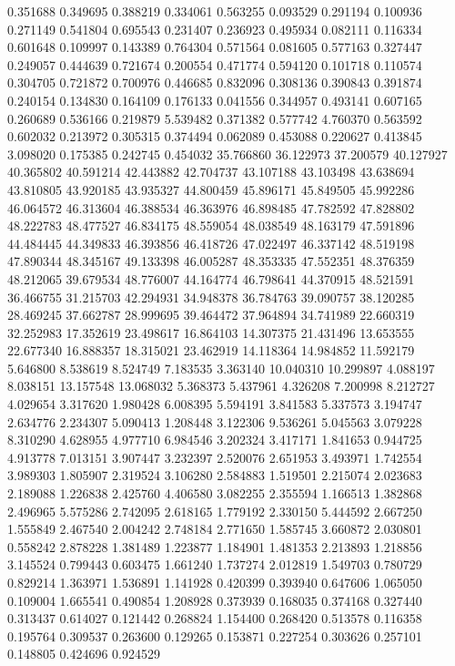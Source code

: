 0.351688
0.349695
0.388219
0.334061
0.563255
0.093529
0.291194
0.100936
0.271149
0.541804
0.695543
0.231407
0.236923
0.495934
0.082111
0.116334
0.601648
0.109997
0.143389
0.764304
0.571564
0.081605
0.577163
0.327447
0.249057
0.444639
0.721674
0.200554
0.471774
0.594120
0.101718
0.110574
0.304705
0.721872
0.700976
0.446685
0.832096
0.308136
0.390843
0.391874
0.240154
0.134830
0.164109
0.176133
0.041556
0.344957
0.493141
0.607165
0.260689
0.536166
0.219879
5.539482
0.371382
0.577742
4.760370
0.563592
0.602032
0.213972
0.305315
0.374494
0.062089
0.453088
0.220627
0.413845
3.098020
0.175385
0.242745
0.454032
35.766860
36.122973
37.200579
40.127927
40.365802
40.591214
42.443882
42.704737
43.107188
43.103498
43.638694
43.810805
43.920185
43.935327
44.800459
45.896171
45.849505
45.992286
46.064572
46.313604
46.388534
46.363976
46.898485
47.782592
47.828802
48.222783
48.477527
46.834175
48.559054
48.038549
48.163179
47.591896
44.484445
44.349833
46.393856
46.418726
47.022497
46.337142
48.519198
47.890344
48.345167
49.133398
46.005287
48.353335
47.552351
48.376359
48.212065
39.679534
48.776007
44.164774
46.798641
44.370915
48.521591
36.466755
31.215703
42.294931
34.948378
36.784763
39.090757
38.120285
28.469245
37.662787
28.999695
39.464472
37.964894
34.741989
22.660319
32.252983
17.352619
23.498617
16.864103
14.307375
21.431496
13.653555
22.677340
16.888357
18.315021
23.462919
14.118364
14.984852
11.592179
5.646800
8.538619
8.524749
7.183535
3.363140
10.040310
10.299897
4.088197
8.038151
13.157548
13.068032
5.368373
5.437961
4.326208
7.200998
8.212727
4.029654
3.317620
1.980428
6.008395
5.594191
3.841583
5.337573
3.194747
2.634776
2.234307
5.090413
1.208448
3.122306
9.536261
5.045563
3.079228
8.310290
4.628955
4.977710
6.984546
3.202324
3.417171
1.841653
0.944725
4.913778
7.013151
3.907447
3.232397
2.520076
2.651953
3.493971
1.742554
3.989303
1.805907
2.319524
3.106280
2.584883
1.519501
2.215074
2.023683
2.189088
1.226838
2.425760
4.406580
3.082255
2.355594
1.166513
1.382868
2.496965
5.575286
2.742095
2.618165
1.779192
2.330150
5.444592
2.667250
1.555849
2.467540
2.004242
2.748184
2.771650
1.585745
3.660872
2.030801
0.558242
2.878228
1.381489
1.223877
1.184901
1.481353
2.213893
1.218856
3.145524
0.799443
0.603475
1.661240
1.737274
2.012819
1.549703
0.780729
0.829214
1.363971
1.536891
1.141928
0.420399
0.393940
0.647606
1.065050
0.109004
1.665541
0.490854
1.208928
0.373939
0.168035
0.374168
0.327440
0.313437
0.614027
0.121442
0.268824
1.154400
0.268420
0.513578
0.116358
0.195764
0.309537
0.263600
0.129265
0.153871
0.227254
0.303626
0.257101
0.148805
0.424696
0.924529
